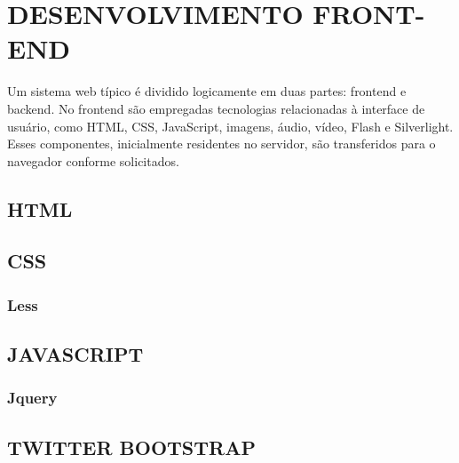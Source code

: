 \chapter{DESENVOLVIMENTO FRONT-END}
\label{desenvolvimentoFrontEnd}

Um sistema web típico é dividido logicamente em duas partes: frontend e backend. 
No frontend são empregadas tecnologias relacionadas à interface de usuário, 
como HTML, CSS, JavaScript, imagens, áudio, vídeo, Flash e Silverlight. Esses 
componentes, inicialmente residentes no servidor, são transferidos para o navegador 
conforme solicitados. 

\section{HTML}
\section{CSS}
\subsection{Less}
\section{JAVASCRIPT}
\subsection{Jquery}
\section{TWITTER BOOTSTRAP}